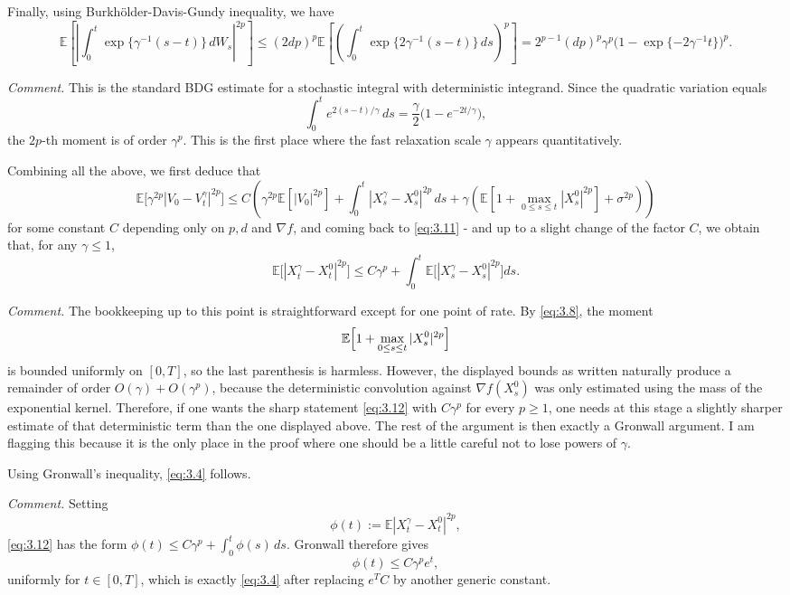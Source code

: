 \documentclass[11pt]{article}
\begin{document}
Finally, using Burkh\"older-Davis-Gundy inequality, we have
\[
\mathbb{E}\left[\left|\int_0^t \exp\{\gamma^{-1}(s-t)\}\,dW_s\right|^{2p}\right]
\le (2dp)^p\mathbb{E}\left[\left(\int_0^t \exp\{2\gamma^{-1}(s-t)\}\,ds\right)^p\right]
=2^{p-1}(dp)^p\gamma^p\bigl(1-\exp\{-2\gamma^{-1}t\}\bigr)^p.
\]

{\color{teal}
\noindent\emph{Comment.} This is the standard BDG estimate for a stochastic integral with deterministic integrand. Since the quadratic variation equals
\[
\int_0^t e^{2(s-t)/\gamma}\,ds=\frac{\gamma}{2}\bigl(1-e^{-2t/\gamma}\bigr),
\]
the $2p$-th moment is of order $\gamma^p$. This is the first place where the fast relaxation scale $\gamma$ appears quantitatively.
}

Combining all the above, we first deduce that
\[
\mathbb{E}\bigl[\gamma^{2p}|V_0-V_t^{\gamma}|^{2p}\bigr]\le C\left(\gamma^{2p}\mathbb{E}[|V_0|^{2p}]+\int_0^t |X_s^{\gamma}-X_s^0|^{2p}\,ds+\gamma\left(\mathbb{E}\left[1+\max_{0\le s\le t}|X_s^0|^{2p}\right]+\sigma^{2p}\right)\right)
\]
for some constant $C$ depending only on $p,d$ and $\nabla f$, and coming back to \eqref{eq:3.11} - and up to a slight change of the factor $C$, we obtain that, for any $\gamma\le 1$,
\begin{equation}
\label{eq:3.12}
\mathbb{E}\bigl[|X_t^{\gamma}-X_t^0|^{2p}\bigr]\le C\gamma^p+\int_0^t \mathbb{E}\bigl[|X_s^{\gamma}-X_s^0|^{2p}\bigr]ds.
\end{equation}

{\color{teal}
\noindent\emph{Comment.} The bookkeeping up to this point is straightforward except for one point of rate. By \eqref{eq:3.8}, the moment
\[
\mathbb{E}\Bigl[1+\max_{0\le s\le t}|X_s^0|^{2p}\Bigr]
\]
is bounded uniformly on $[0,T]$, so the last parenthesis is harmless. However, the displayed bounds as written naturally produce a remainder of order $O(\gamma)+O(\gamma^p)$, because the deterministic convolution against $\nabla f(X_s^0)$ was only estimated using the mass of the exponential kernel. Therefore, if one wants the sharp statement \eqref{eq:3.12} with $C\gamma^p$ for every $p\ge1$, one needs at this stage a slightly sharper estimate of that deterministic term than the one displayed above. The rest of the argument is then exactly a Gronwall argument. I am flagging this because it is the only place in the proof where one should be a little careful not to lose powers of $\gamma$.
}

Using Gronwall's inequality, \eqref{eq:3.4} follows.

{\color{teal}
\noindent\emph{Comment.} Setting
\[
\phi(t):=\mathbb{E}|X_t^\gamma-X_t^0|^{2p},
\]
\eqref{eq:3.12} has the form $\phi(t)\le C\gamma^p+\int_0^t \phi(s)\,ds$. Gronwall therefore gives
\[
\phi(t)\le C\gamma^p e^t,
\]
uniformly for $t\in[0,T]$, which is exactly \eqref{eq:3.4} after replacing $e^T C$ by another generic constant.
}
\end{document}
